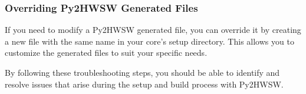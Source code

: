 \subsubsection{Overriding Py2HWSW Generated Files}

If you need to modify a Py2HWSW generated file, you can override it by creating a new file with the same name in your core's setup directory. This allows you to customize the generated files to suit your specific needs.

By following these troubleshooting steps, you should be able to identify and resolve issues that arise during the setup and build process with Py2HWSW.
